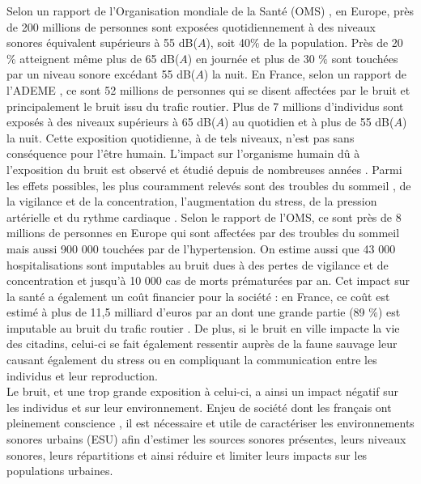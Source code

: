 Selon un rapport de l'Organisation mondiale de la Santé (OMS) \cite{who_burden_2017}, en Europe, près de 200 millions de personnes sont exposées quotidiennement à des niveaux sonores équivalent supérieurs à 55 dB($A$), soit 40$\%$ de la population. Près de 20 $\%$ atteignent même plus de 65 dB($A$) en journée et plus de 30 $\%$ sont touchées par un niveau sonore excédant 55 dB($A$) la nuit. En France, selon un rapport de l'ADEME \cite{europeens2016analyse}, ce sont 52 millions de personnes qui se disent affectées par le bruit et principalement le bruit issu du trafic routier. Plus de 7 millions d'individus sont exposés à des niveaux supérieurs à 65 dB($A$) au quotidien et à plus de 55 dB($A$) la nuit.
Cette exposition quotidienne, à de tels niveaux, n'est pas sans conséquence pour l'être humain. L'impact sur l'organisme humain dû à l'exposition du bruit est observé et étudié depuis de nombreuses années \cite{ising1980health}. Parmi les effets possibles, les plus couramment relevés sont des troubles du sommeil \cite{pirrera2010nocturnal}, de la vigilance et de la concentration, l'augmentation du stress, de la pression artérielle et du rythme cardiaque \cite{babisch2005traffic, babisch2008road}. Selon le rapport de l'OMS, ce sont près de 8 millions de personnes en Europe qui sont affectées par des troubles du sommeil mais aussi 900 000 touchées par de l'hypertension. On estime aussi que 43 000 hospitalisations sont imputables au bruit dues à des pertes de vigilance et de concentration et jusqu'à 10 000 cas de morts prématurées par an. Cet impact sur la santé a également un coût financier pour la société : en France, ce coût est estimé à plus de 11,5 milliard d'euros par an dont une grande partie (89 $\%$) est imputable au bruit du trafic routier \cite{europeens2016analyse}. De plus, si le bruit en ville impacte la vie des citadins, celui-ci se fait également ressentir auprès de la faune sauvage \cite{dutilleux_anthropogenic_2012, francis2009noise} leur causant également du stress ou en compliquant la communication entre les individus et leur reproduction.\\

Le bruit, et une trop grande exposition à celui-ci, a ainsi un impact négatif sur les individus et sur leur environnement. Enjeu de société dont les français ont pleinement conscience \cite{JNA2016etude}, il est nécessaire et utile de caractériser les environnements sonores urbains (ESU) afin d'estimer les sources sonores présentes, leurs niveaux sonores, leurs répartitions et ainsi réduire et limiter leurs impacts sur les populations urbaines.

